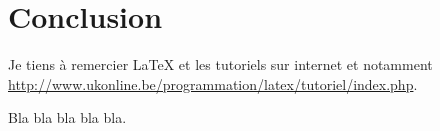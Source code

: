 \section*{Conclusion}

Je tiens à remercier \LaTeX{} et les tutoriels sur internet et notamment \url{http://www.ukonline.be/programmation/latex/tutoriel/index.php}.

Bla bla bla bla bla.
